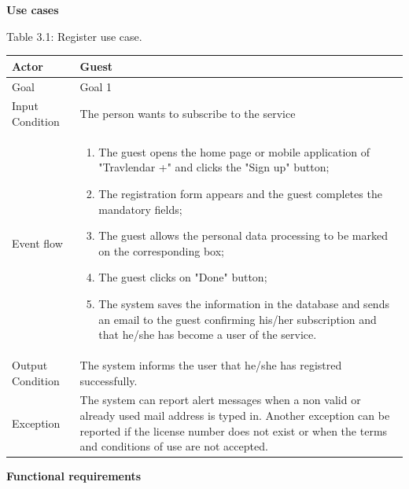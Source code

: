\documentclass{article}
\begin{document}
	\newpage
	\noindent
	\textbf{Use cases} \\

	\begin{center}
		Table 3.1: Register use case.
		
		\bigskip
		\begin{tabular}{p{}|p{}}
	   		\hline
	    		Actor & Guest \\ \hline
	    		Goal & Goal 1 \\ \hline
	    		Input Condition & The person wants to subscribe to the service \\ \hline
	    		Event flow & 
			\begin{enumerate}
	  			\item The guest opens the home page or mobile application of "Travlendar +"  and clicks the "Sign up" button;
	  			\item The registration form appears and the guest completes the mandatory fields;
	  			\item The guest allows the personal data processing to be marked on the corresponding box;
	  			\item The guest clicks on "Done" button;
	  			\item The system saves the information in the database and sends an email to the guest confirming his/her subscription and that he/she has become a user of the service.
	 		 \end{enumerate} \\ \hline
	    		Output Condition & The system informs the user that he/she has registred successfully. \\ \hline
	    		Exception & The system can report alert messages when a non valid or already used mail address is typed in. Another exception can be reported if the license number does not exist or when the terms and conditions of use are not accepted. \\ \hline
	    	\end{tabular}
	\end{center}
	
	\bigskip
	\noindent
	\textbf{Functional requirements} \\
	
\end{document}
